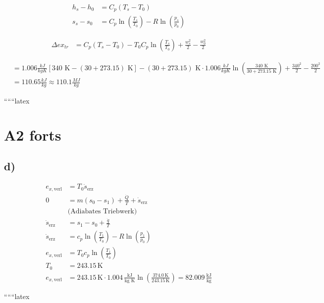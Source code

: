 \begin{align*}
h_s - h_0 &= C_p (T_s - T_0) \\
s_s - s_0 &= C_p \ln \left( \frac{T_s}{T_0} \right) - R \ln \left( \frac{p_s}{p_0} \right)
\end{align*}

\begin{align*}
\Delta ex_{tr} &= C_p (T_s - T_0) - T_0 C_p \ln \left( \frac{T_s}{T_0} \right) + \frac{w_s^2}{2} - \frac{w_0^2}{2}
\end{align*}

\begin{align*}
&= 1.006 \frac{kJ}{kg K} \left[ 340 \text{ K} - (30 + 273.15) \text{ K} \right] - (30 + 273.15) \text{ K} \cdot 1.006 \frac{kJ}{kg K} \ln \left( \frac{340 \text{ K}}{30 + 273.15 \text{ K}} \right) + \frac{340^2}{2} - \frac{200^2}{2} \\
&= 110.65 \frac{kJ}{kg} \approx 110.1 \frac{MJ}{kg}
\end{align*}

``````latex


\section*{A2 forts}

\subsection*{d)}

\begin{align*}
    e_{x, \text{verl}} &= T_0 \dot{s}_{\text{erz}} \\
    0 &= m (s_0 - s_1) + \frac{\dot{Q}}{T} + \dot{s}_{\text{erz}} \\
    &\text{(Adiabates Triebwerk)} \\
    \dot{s}_{\text{erz}} &= s_1 - s_0 + \frac{\dot{q}}{T} \\
    \dot{s}_{\text{erz}} &= c_p \ln \left( \frac{T_1}{T_0} \right) - R \ln \left( \frac{p_1}{p_0} \right) \\
    e_{x, \text{verl}} &= T_0 c_p \ln \left( \frac{T_1}{T_0} \right) \\
    T_0 &= 243.15 \, \text{K} \\
    e_{x, \text{verl}} &= 243.15 \, \text{K} \cdot 1.004 \, \frac{\text{kJ}}{\text{kg K}} \ln \left( \frac{374.0 \, \text{K}}{243.15 \, \text{K}} \right) = 82.009 \, \frac{\text{kJ}}{\text{kg}}
\end{align*}

``````latex


